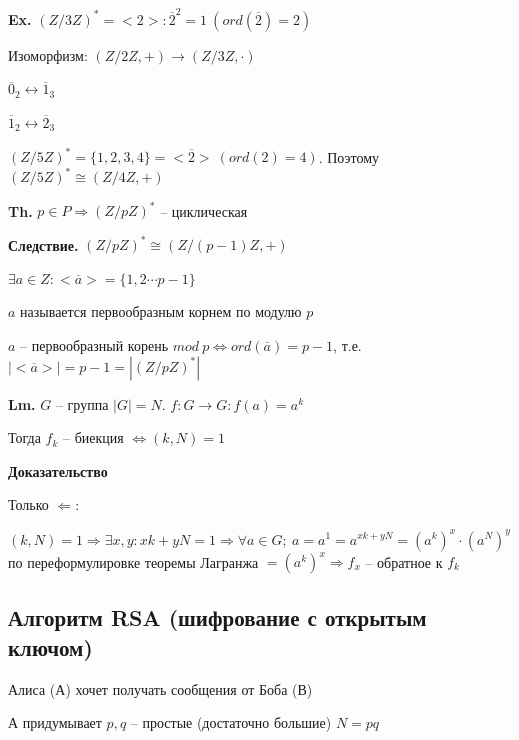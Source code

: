 \documentclass[14pt, letter paper]{article}
\begin{document}
\vspace{5mm}

\textbf{Ex.} $(Z/3Z)^* = <2> : \overline{2}^2 = 1\ (ord(\overline{2}) = 2)$

Изоморфизм: $(Z/2Z, +) \rightarrow (Z/3Z, \cdot)$

$\overline{0}_2 \leftrightarrow \overline{1}_3$

$\overline{1}_2 \leftrightarrow \overline{2}_3$

$(Z/5Z)^* = \{1, 2, 3, 4\} = <\overline{2}>\ (ord(2) = 4)$. Поэтому $(Z/5Z)^* \cong (Z/4Z, +)$

\vspace{5mm}

\textbf{Th.} $p \in P \Rightarrow (Z/pZ)^*$ -- циклическая

\textbf{Следствие.} $(Z/pZ)^* \cong (Z/(p-1)Z, +)$

$\exists a \in Z : <\overline{a}> = \{1, 2 \cdots p-1\}$

$a$ называется первообразным корнем по модулю $p$

$a$ -- первообразный корень $mod\ p \Leftrightarrow ord(\overline{a}) = p - 1$, т.е. $|<\overline{a}>| = p - 1 = |(Z/pZ)^*|$

\vspace{5mm}

\textbf{Lm.} $G$ -- группа $|G| = N$. $f : G \rightarrow G : f(a) = a^k$

Тогда $f_k$ -- биекция $\Leftrightarrow (k, N) = 1$

\begin{center}
    \textbf{Доказательство}
\end{center}

Только $\Leftarrow$:

$(k, N) = 1 \Rightarrow \exists x, y : xk + yN = 1 \Rightarrow \forall a \in G;\ a = a^1 = a^{xk + yN} = (a^k)^x \cdot (a^N)^y$ по переформулировке теоремы Лагранжа $= (a^k)^x \Rightarrow f_x$ -- обратное к $f_k$

\begin{center}
    \section*{Алгоритм RSA (шифрование с открытым ключом)}
\end{center}

Алиса (А) хочет получать сообщения от Боба (В)

А придумывает $p, q$ -- простые (достаточно большие) $N = pq$
\end{document}
